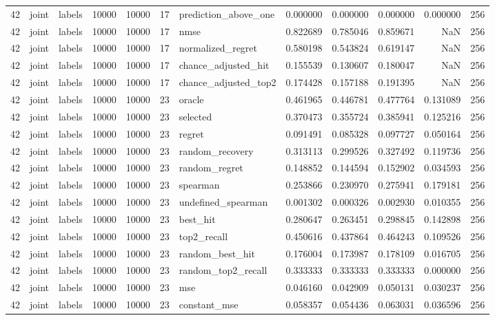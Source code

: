 \begin{tabular}{rllrrrlrrrrr}
42 & joint & labels & 10000 & 10000 & 17 & prediction_above_one & 0.000000 & 0.000000 & 0.000000 & 0.000000 & 256 \\
42 & joint & labels & 10000 & 10000 & 17 & nmse & 0.822689 & 0.785046 & 0.859671 & NaN & 256 \\
42 & joint & labels & 10000 & 10000 & 17 & normalized_regret & 0.580198 & 0.543824 & 0.619147 & NaN & 256 \\
42 & joint & labels & 10000 & 10000 & 17 & chance_adjusted_hit & 0.155539 & 0.130607 & 0.180047 & NaN & 256 \\
42 & joint & labels & 10000 & 10000 & 17 & chance_adjusted_top2 & 0.174428 & 0.157188 & 0.191395 & NaN & 256 \\
42 & joint & labels & 10000 & 10000 & 23 & oracle & 0.461965 & 0.446781 & 0.477764 & 0.131089 & 256 \\
42 & joint & labels & 10000 & 10000 & 23 & selected & 0.370473 & 0.355724 & 0.385941 & 0.125216 & 256 \\
42 & joint & labels & 10000 & 10000 & 23 & regret & 0.091491 & 0.085328 & 0.097727 & 0.050164 & 256 \\
42 & joint & labels & 10000 & 10000 & 23 & random_recovery & 0.313113 & 0.299526 & 0.327492 & 0.119736 & 256 \\
42 & joint & labels & 10000 & 10000 & 23 & random_regret & 0.148852 & 0.144594 & 0.152902 & 0.034593 & 256 \\
42 & joint & labels & 10000 & 10000 & 23 & spearman & 0.253866 & 0.230970 & 0.275941 & 0.179181 & 256 \\
42 & joint & labels & 10000 & 10000 & 23 & undefined_spearman & 0.001302 & 0.000326 & 0.002930 & 0.010355 & 256 \\
42 & joint & labels & 10000 & 10000 & 23 & best_hit & 0.280647 & 0.263451 & 0.298845 & 0.142898 & 256 \\
42 & joint & labels & 10000 & 10000 & 23 & top2_recall & 0.450616 & 0.437864 & 0.464243 & 0.109526 & 256 \\
42 & joint & labels & 10000 & 10000 & 23 & random_best_hit & 0.176004 & 0.173987 & 0.178109 & 0.016705 & 256 \\
42 & joint & labels & 10000 & 10000 & 23 & random_top2_recall & 0.333333 & 0.333333 & 0.333333 & 0.000000 & 256 \\
42 & joint & labels & 10000 & 10000 & 23 & mse & 0.046160 & 0.042909 & 0.050131 & 0.030237 & 256 \\
42 & joint & labels & 10000 & 10000 & 23 & constant_mse & 0.058357 & 0.054436 & 0.063031 & 0.036596 & 256 \\

\end{tabular}
